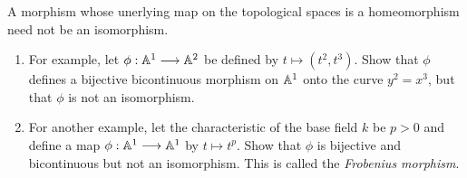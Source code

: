\label{1.3.2}

A morphism whose unerlying map on the topological spaces is a homeomorphism need not be an isomorphism.

\begin{enumerate}[label = (\alph*)]
    \item For example, let $\phi: \mathbb A^1 \longrightarrow \mathbb A^2$ be defined by $t \mapsto (t^2, t^3)$. Show that $\phi$ defines a bijective bicontinuous morphism on $\mathbb A^1$ onto the curve $y^2 = x^3$, but that $\phi$ is not an isomorphism.

    \item For another example, let the characteristic of the base field $k$ be $p > 0$ and define a map $\phi: \mathbb A^1 \longrightarrow \mathbb A^1$ by $t \mapsto t^p$. Show that $\phi$ is bijective and bicontinuous but not an isomorphism. This is called the \emph{Frobenius morphism}.
\end{enumerate}

